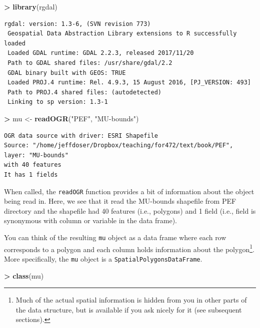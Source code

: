 \documentclass[]{krantz}
\makeatletter
\newenvironment{Shaded}{\begin{snugshade}}{\end{snugshade}}
\newcommand{\KeywordTok}[1]{\textcolor[rgb]{0.27,0.27,0.27}{\textbf{#1}}}
\newcommand{\StringTok}[1]{\textcolor[rgb]{0.5,0.5,0.5}{#1}}
\newcommand{\OperatorTok}[1]{\textcolor[rgb]{0.43,0.43,0.43}{\textbf{#1}}}
\newcommand{\NormalTok}[1]{#1}
\newenvironment{kframe}{%
\medskip{}
\setlength{\fboxsep}{.8em}
 \def\at@end@of@kframe{}%
 \ifinner\ifhmode%
  \def\at@end@of@kframe{\end{minipage}}%
  \begin{minipage}{\columnwidth}%
 \fi\fi%
 \def\FrameCommand##1{\hskip\@totalleftmargin \hskip-\fboxsep
 \colorbox{shadecolor}{##1}\hskip-\fboxsep
     \hskip-\linewidth \hskip-\@totalleftmargin \hskip\columnwidth}%
 \MakeFramed {\advance\hsize-\width
   \@totalleftmargin\z@ \linewidth\hsize
   \@setminipage}}%
 {\par\unskip\endMakeFramed%
 \at@end@of@kframe}
\renewenvironment{Shaded}{\begin{kframe}}{\end{kframe}}
\theoremstyle{definition}
\theoremstyle{definition}
\theoremstyle{definition}
\theoremstyle{remark}
\makeatother
\begin{document}
\begin{Shaded}
\begin{Highlighting}[]
\OperatorTok{>}\StringTok{ }\KeywordTok{library}\NormalTok{(rgdal)}
\end{Highlighting}
\end{Shaded}

\begin{verbatim}
rgdal: version: 1.3-6, (SVN revision 773)
 Geospatial Data Abstraction Library extensions to R successfully loaded
 Loaded GDAL runtime: GDAL 2.2.3, released 2017/11/20
 Path to GDAL shared files: /usr/share/gdal/2.2
 GDAL binary built with GEOS: TRUE 
 Loaded PROJ.4 runtime: Rel. 4.9.3, 15 August 2016, [PJ_VERSION: 493]
 Path to PROJ.4 shared files: (autodetected)
 Linking to sp version: 1.3-1 
\end{verbatim}

\begin{Shaded}
\begin{Highlighting}[]
\OperatorTok{>}\StringTok{ }\NormalTok{mu <-}\StringTok{ }\KeywordTok{readOGR}\NormalTok{(}\StringTok{"PEF"}\NormalTok{, }\StringTok{"MU-bounds"}\NormalTok{)}
\end{Highlighting}
\end{Shaded}

\begin{verbatim}
OGR data source with driver: ESRI Shapefile 
Source: "/home/jeffdoser/Dropbox/teaching/for472/text/book/PEF", layer: "MU-bounds"
with 40 features
It has 1 fields
\end{verbatim}

When called, the \texttt{readOGR} function provides a bit of information
about the object being read in. Here, we see that it read the MU-bounds
shapefile from PEF directory and the shapefile had 40 features (i.e.,
polygons) and 1 field (i.e., field is synonymous with column or variable
in the data frame).

You can think of the resulting \texttt{mu} object as a data frame where
each row corresponds to a polygon and each column holds information
about the polygon\footnote{Much of the actual spatial information is
  hidden from you in other parts of the data structure, but is available
  if you ask nicely for it (see subsequent sections).}. More
specifically, the \texttt{mu} object is a
\texttt{SpatialPolygonsDataFrame}.

\begin{Shaded}
\begin{Highlighting}[]
\OperatorTok{>}\StringTok{ }\KeywordTok{class}\NormalTok{(mu)}
\end{Highlighting}
\end{Shaded}
\end{document}
